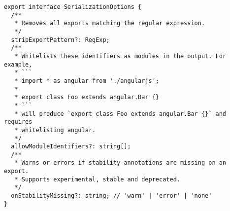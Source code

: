 \begin{verbatim}
export interface SerializationOptions {
  /**
   * Removes all exports matching the regular expression.
   */
  stripExportPattern?: RegExp;
  /**
   * Whitelists these identifiers as modules in the output. For example,
   * ```
   * import * as angular from './angularjs';
   *
   * export class Foo extends angular.Bar {}
   * ```
   * will produce `export class Foo extends angular.Bar {}` and requires
   * whitelisting angular.
   */
  allowModuleIdentifiers?: string[];
  /**
   * Warns or errors if stability annotations are missing on an export.
   * Supports experimental, stable and deprecated.
   */
  onStabilityMissing?: string; // 'warn' | 'error' | 'none'
}
\end{verbatim}
